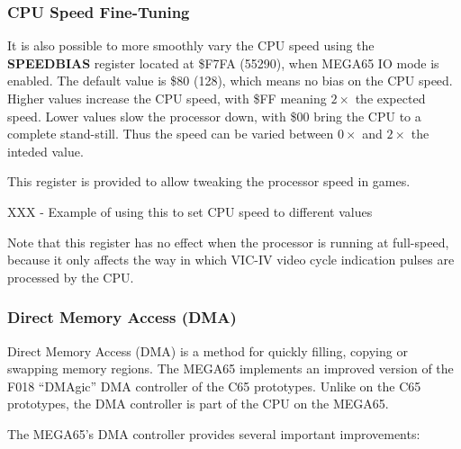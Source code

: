 \subsubsection{CPU Speed Fine-Tuning}
It is also possible to more smoothly
vary the CPU speed using the {\bf SPEEDBIAS} register located at \$F7FA (55290), when MEGA65 IO mode
is enabled.  The default value is \$80 (128), which means no bias on the CPU speed.  Higher values
increase the CPU speed, with \$FF meaning $2\times$ the expected speed. Lower values slow
the processor down, with \$00 bring the CPU to a complete stand-still.  Thus the speed can be
varied between $0\times$ and $2\times$ the inteded value.

This register is provided to allow tweaking the processor speed in games.

XXX - Example of using this to set CPU speed to different values

Note that this register has no effect when
the processor is running at full-speed, because it only affects the way in which VIC-IV
video cycle indication pulses are processed by the CPU.  

\subsubsection{Direct Memory Access (DMA)}
Direct Memory Access (DMA) is a method for quickly filling, copying or swapping memory regions.
The MEGA65 implements an improved version of the F018 ``DMAgic'' DMA controller of the C65 prototypes.
Unlike on the C65 prototypes, the DMA controller is part of the CPU on the MEGA65.

The MEGA65's DMA controller provides several important improvements:

